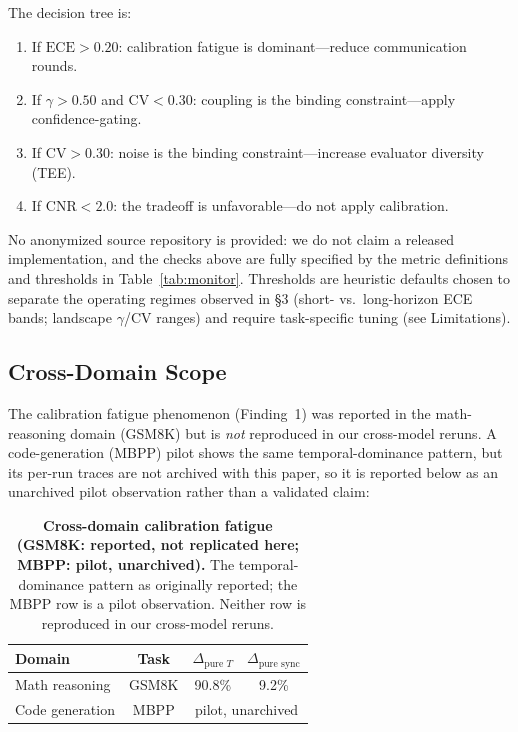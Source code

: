 \documentclass[11pt]{article}
\newcommand{\CV}{\ensuremath{\mathrm{CV}}}
\newcommand{\ECE}{\ensuremath{\mathrm{ECE}}}
\theoremstyle{definition}
\theoremstyle{remark}
\begin{document}
The decision tree is:
\begin{enumerate}[leftmargin=*,nosep]
    \item If $\ECE > 0.20$: calibration fatigue is dominant---reduce communication rounds.
    \item If $\gamma > 0.50$ and $\CV < 0.30$: coupling is the binding constraint---apply confidence-gating.
    \item If $\CV > 0.30$: noise is the binding constraint---increase evaluator diversity (TEE).
    \item If $\text{CNR} < 2.0$: the tradeoff is unfavorable---do not apply calibration.
\end{enumerate}

\noindent No anonymized source repository is provided: we do not claim a released implementation, and the checks above are fully specified by the metric definitions and thresholds in Table~\ref{tab:monitor}. Thresholds are heuristic defaults chosen to separate the operating regimes observed in \S3 (short- vs.\ long-horizon ECE bands; landscape $\gamma$/$\CV$ ranges) and require task-specific tuning (see Limitations).

\subsection{Cross-Domain Scope}

The calibration fatigue phenomenon (Finding~1) was reported in the math-reasoning domain (GSM8K) but is \emph{not} reproduced in our cross-model reruns. A code-generation (MBPP) pilot shows the same temporal-dominance pattern, but its per-run traces are not archived with this paper, so it is reported below as an unarchived pilot observation rather than a validated claim:

\begin{table}[H]
\centering
\caption{\textbf{Cross-domain calibration fatigue (GSM8K: reported, not replicated here; MBPP: pilot, unarchived).} The temporal-dominance pattern as originally reported; the MBPP row is a pilot observation. Neither row is reproduced in our cross-model reruns.}
\begin{tabular}{@{}lccc@{}}
\toprule
Domain & Task & $\Delta_{\text{pure } T}$ & $\Delta_{\text{pure sync}}$ \\
\midrule
Math reasoning & GSM8K & 90.8\% & 9.2\% \\
Code generation & MBPP & \multicolumn{2}{c}{\footnotesize pilot, unarchived} \\
\bottomrule
\end{tabular}
\end{table}
\end{document}
